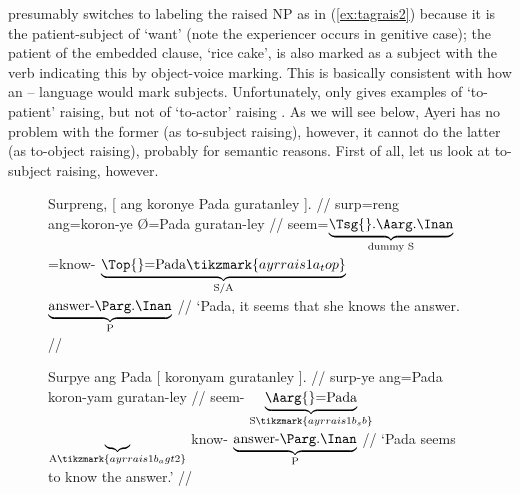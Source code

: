 \citet{kroeger1991} presumably switches to labeling the raised NP as \Abs{} in
(\ref{ex:tagrais2}) because it is the patient-subject of  `want'
(note the experiencer  occurs in genitive case); the patient of the
embedded clause,  `rice cake', is also marked as a subject with the
verb indicating this by object-voice marking. This is basically consistent with
how an \Erg{}--\Abs{} language would mark subjects. Unfortunately,
\citet{kroeger1991} only gives examples of `to-patient' raising, but not of
`to-actor' raising \citep[430]{carnie2013}. As we will see below, Ayeri has no
problem with the former (as to-subject raising), however, it cannot do the
latter (as to-object raising), probably for semantic reasons. First of all, let
us look at to-subject raising, however.

\begin{figure}
\pex\label{ex:ayrrais1}
\a\label{ex:ayrrais1_1}\begingl[aboveglcskip=1.5em]
	\gla Surpreng, \textup{[} {ang koronye} Pada guratanley
		\textup{]}. //
	\glb surp=reng {} ang=koron-ye Ø=Pada guratan-ley {} //
	\glc seem=$\underbrace{\text{\smash{\Tsg{}}.\AargI{}}}_{\text{dummy S}}$
		{}
		\AgtT{}=know-\TsgF{}%
		$\underbrace{\text{\Top{}=Pada}%
			\tikzmark{ayrrais1a_top}%
		}_{\text{S/A}}$
		$\underbrace{\text{answer-\PargI{}}}_{\text{P}}$
		{}
		//
	\glft `Pada, it seems that she knows the answer. //
\endgl
{}

\a\label{ex:ayrrais1_2}\begingl[aboveglftskip=1.75em]
	\gla Surpye {ang Pada} \textup{[} {} koronyam guratanley
		\textup{]}. //
	\glb surp-ye ang=Pada {} {} koron-yam guratan-ley {} //
	\glc seem-\TsgF{}
		$\underbrace{\text{\Aarg{}=Pada}}_{\text{S}%
			\tikzmark{ayrrais1b_sb}%
		}$
		{}
		$\underbrace{}_{\text{A}%
			\tikzmark{ayrrais1b_agt2}%
		}$
		know-\Ptcp{}
		$\underbrace{\text{answer-\PargI{}}}_{\text{P}}$
		{}
		//
	\glft `Pada seems to know the answer.' //
\endgl
{}


\end{figure}

